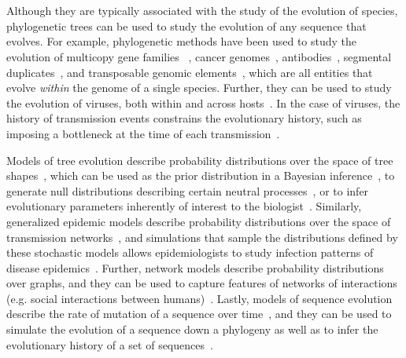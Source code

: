 \chapter*{\introtitle}
\clearpage

Although they are typically associated with the study of the evolution of species, phylogenetic trees can be used to study the evolution of any sequence that evolves. For example, phylogenetic methods have been used to study the evolution of multicopy gene families~ \cite{Page1997}, cancer genomes~\cite{El-Kebir2016,Nowell1976}, antibodies~\cite{Litman1993,Robinson2015,Safonova2015}, segmental duplicates~\cite{Bailey2006,Jiang2007}, and transposable genomic elements~\cite{Dewannieux2003,Moshiri2017}, which are all entities that evolve \textit{within} the genome of a single species. Further, they can be used to study the evolution of viruses, both within and across hosts~\cite{Frost2001,Lemey2006,Vrancken2014}. In the case of viruses, the history of transmission events constrains the evolutionary history, such as imposing a bottleneck at the time of each transmission~\cite{Carlson2014}.

Models of tree evolution describe probability distributions over the space of tree shapes~\cite{Yule1925,Aldous2001}, which can be used as the prior distribution in a Bayesian inference~\cite{Drummond2007,Mooers2012,Sayyari2016}, to generate null distributions describing certain neutral processes~\cite{Guyer1991,Kirkpatrick1993,Agapow2002}, or to infer evolutionary parameters inherently of interest to the biologist~\cite{Morlon2014}. Similarly, generalized epidemic models describe probability distributions over the space of transmission networks~\cite{Sahneh2013}, and simulations that sample the distributions defined by these stochastic models allows epidemiologists to study infection patterns of disease epidemics~\cite{Sahneh2017}. Further, network models describe probability distributions over graphs, and they can be used to capture features of networks of interactions (e.g. social interactions between humans)~\cite{Watts1998,Watts1999,Barabasi1999,Erdos1959}. Lastly, models of sequence evolution describe the rate of mutation of a sequence over time~\cite{Jukes1969,Kimura1980,Felsenstein1981,Tamura1993,Tavare1986}, and they can be used to simulate the evolution of a sequence down a phylogeny as well as to infer the evolutionary history of a set of sequences~\cite{Felsenstein2003}.

